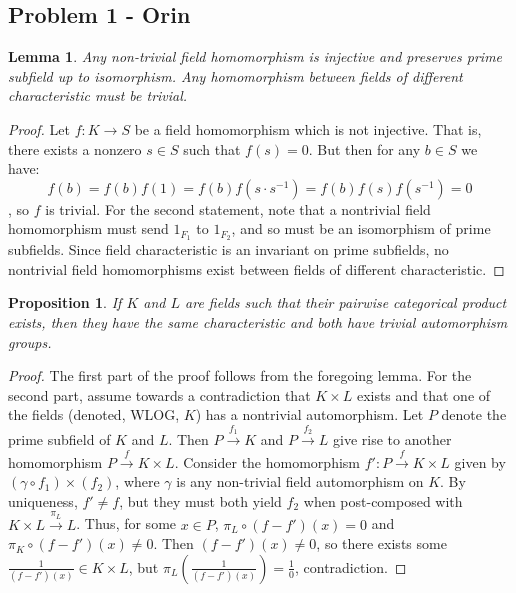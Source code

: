 \documentclass{article}
\newtheorem{proposition}[subsection]{Proposition}
\newtheorem{lemma}[subsection]{Lemma}
\begin{document}
\subsection{Problem 1 - Orin}
\begin{lemma}
	Any non-trivial field homomorphism is injective and preserves prime subfield up to isomorphism.  Any homomorphism between fields of different characteristic must be trivial.
\end{lemma}
\begin{proof}
	Let $f: K\rightarrow{S}$ be a field homomorphism which is not injective.  That is, there exists a nonzero $s\in S$ such that $f(s)=0$.  But then for any $b\in S$ we have: $$f(b) = f(b)f(1)=f(b)f(s\cdot{s^{-1}})=f(b)f(s)f(s^{-1})=0$$, so $f$ is trivial.  For the second statement, note that a nontrivial field homomorphism must send $1_{F_1}$ to $1_{F_2}$, and so must be an isomorphism of prime subfields.  Since field characteristic is an invariant on prime subfields, no nontrivial field homomorphisms exist between fields of different characteristic. 
\end{proof}
\begin{proposition}
	If $K$ and $L$ are fields such that their pairwise categorical product exists, then they have the same characteristic and both have trivial automorphism groups.
\end{proposition}
\begin{proof}
	The first part of the proof follows from the foregoing lemma.  For the second part, assume towards a contradiction that $K\times L$ exists and that one of the fields (denoted, WLOG, $K$) has a nontrivial automorphism.  Let $P$ denote the prime subfield of $K$ and $L$.  Then $P\xrightarrow{f_1}K$ and $P\xrightarrow{f_2}L$ give rise to another homomorphism $P\xrightarrow{f}K\times L$.  Consider the homomorphism $f': P\xrightarrow{f}K\times L$ given by $(\gamma\circ f_1)\times(f_2)$, where $\gamma$ is any non-trivial field automorphism on $K$.  By uniqueness, $f'\neq f$, but they must both yield $f_2$ when post-composed with $K\times L\xrightarrow{\pi_L}L$.  Thus, for some $x\in P$, $\pi_L\circ{(f-f')}(x)=0$ and $\pi_K\circ{(f-f')}(x)\neq 0$.  Then $(f-f')(x)\neq 0$, so there exists some $\frac{1}{(f-f')(x)}\in K\times L$, but $\pi_L (\frac{1}{(f-f')(x)}) = \frac{1}{0}$, contradiction.
\end{proof}
\end{document}
